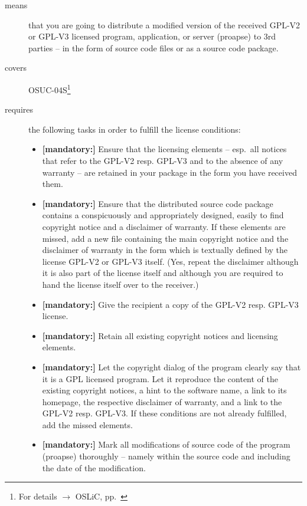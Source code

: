 \begin{description}
\item[means] that you are going to distribute a modified version of the received
GPL-V2 or GPL-V3 licensed program, application, or server (proapse) to 3rd
parties -- in the form of source code files or as a source code package.
\item[covers] OSUC-04S\footnote{For details $\rightarrow$ OSLiC, pp.\
\pageref{OSUC-04S-DEF}}

\item[requires] the following tasks in order to fulfill the license conditions:
\begin{itemize}
  
  \item \textbf{[mandatory:]} Ensure that the licensing elements -- esp.\ all
  notices that refer to the GPL-V2 resp. GPL-V3 and to the absence of any
  warranty -- are retained in your package in the form you have received them.

  \item \textbf{[mandatory:]} Ensure that the distributed source code package
  contains a conspicuously and appropriately designed, easily to find copyright
  notice and a disclaimer of warranty. If these elements are missed, add a new
  file containing the main copyright notice and the disclaimer of warranty in
  the form which is textually defined by the license GPL-V2 or GPL-V3 itself.
  (Yes, repeat the disclaimer although it is also part of the license itself and
  although you are required to hand the license itself over to the receiver.)
  
  \item \textbf{[mandatory:]} Give the recipient a copy of the GPL-V2 resp.
  GPL-V3 license.
  
  \item \textbf{[mandatory:]} Retain all existing copyright notices and
  licensing elements.
  
  \item \textbf{[mandatory:]} Let the copyright dialog of the program clearly
  say that it is a GPL licensed program. Let it reproduce the content of the
  existing copyright notices, a hint to the software name, a link to its
  homepage, the respective disclaimer of warranty, and a link to the GPL-V2
  resp. GPL-V3. If these conditions are not already fulfilled, add the missed
  elements.

  \item \textbf{[mandatory:]} Mark all modifications of source code of the
  program (proapse) thoroughly -- namely within the source code and including
  the date of the modification.
  

\end{itemize}
\end{description}

